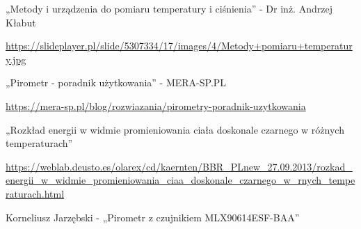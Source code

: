 

\begin{thebibliography}{999}
\begin{spacing}{0.8}


    





    

     „Metody i urządzenia do pomiaru temperatury i ciśnienia” - Dr inż. Andrzej Kłabut

    \url{https://slideplayer.pl/slide/5307334/17/images/4/Metody+pomiaru+temperatury.jpg}

     „Pirometr - poradnik użytkowania” - MERA-SP.PL

    \url{https://mera-sp.pl/blog/rozwiazania/pirometry-poradnik-uzytkowania}

     „Rozkład energii w widmie promieniowania ciała doskonale czarnego w różnych temperaturach”

    \url{https://weblab.deusto.es/olarex/cd/kaernten/BBR_PLnew_27.09.2013/rozkad_energii_w_widmie_promieniowania_ciaa_doskonale_czarnego_w_rnych_temperaturach.html}

     Korneliusz Jarzębski - „Pirometr z czujnikiem MLX90614ESF-BAA”


\end{spacing}
\end{thebibliography}
